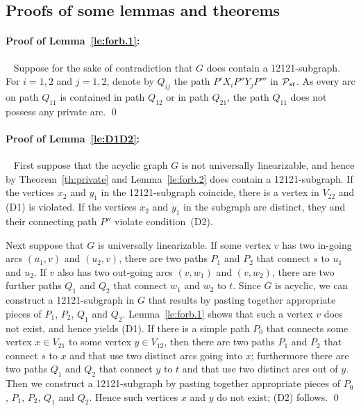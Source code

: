 \documentclass[runningheads]{llncs}
\begin{document}
\begin{appendix}

\section{Proofs of some lemmas and theorems}
\paragraph*{\bf Proof of Lemma~\ref{le:forb.1}:}~
Suppose for the sake of contradiction that $G$ does contain a 12121-subgraph.
For $i=1,2$ and $j=1,2$, denote by $Q_{ij}$ the path $P'X_iP''Y_jP'''$ in ${\cal P}_{st}$.
As every arc on path $Q_{11}$ is contained in path $Q_{12}$ or in path $Q_{21}$, the path $Q_{11}$
does not possess any private arc.
\qed

\paragraph*{\bf Proof of Lemma~\ref{le:D1D2}:}~
First suppose that the acyclic graph $G$ is not universally linearizable, and hence
by Theorem~\ref{th:private} and Lemma~\ref{le:forb.2} does contain a 12121-subgraph.
If the vertices $x_2$ and $y_1$ in the 12121-subgraph coincide, there is a vertex in $V_{22}$
and (D1) is violated.
If the vertices $x_2$ and $y_1$ in the subgraph are distinct, they and their connecting
path $P''$ violate condition~(D2).

Next suppose that $G$ is universally linearizable.
If some vertex $v$ has two in-going arcs $(u_1,v)$ and $(u_2,v)$, there are two
paths $P_1$ and $P_2$ that connect $s$ to $u_1$ and $u_2$.
If $v$ also has two out-going arcs $(v,w_1)$ and $(v,w_2)$, there are two further
paths $Q_1$ and $Q_2$ that connect $w_1$ and $w_2$ to $t$.
Since $G$ is acyclic, we can construct a 12121-subgraph in $G$ that results by pasting together
appropriate pieces of $P_1$, $P_2$, $Q_1$ and $Q_2$.
Lemma~\ref{le:forb.1} shows that such a vertex $v$ does not exist, and hence yields (D1).
If there is a simple path $P_0$ that connects some vertex $x\in V_{21}$ to some vertex $y\in V_{12}$,
then there are two paths $P_1$ and $P_2$ that connect $s$ to $x$ and that use two distinct
arcs going into $x$; furthermore there are two paths $Q_1$ and $Q_2$ that connect $y$ to $t$ and
that use two distinct arcs out of $y$.
Then we construct a 12121-subgraph by pasting together appropriate pieces of
$P_0$, $P_1$, $P_2$, $Q_1$ and $Q_2$.
Hence such vertices $x$ and $y$ do not exist; (D2) follows.
\qed


\end{appendix}
\end{document}
